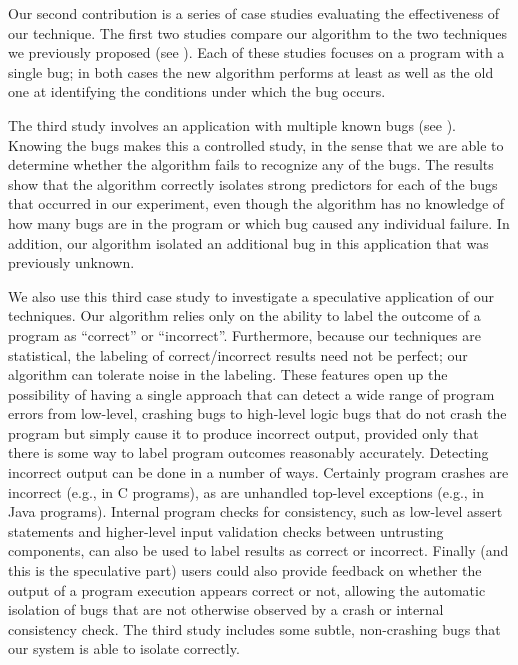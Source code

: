 \documentclass{sig-alternate}
\begin{document}
Our second contribution is a series of case studies evaluating the effectiveness of
our technique.  The first two studies compare our algorithm to the two techniques
we previously proposed (see ).  Each of these studies focuses on a
program with a single bug; in both cases the new algorithm
performs at least as well as the old one at identifying the conditions under which the bug occurs.  

The third study involves an application with multiple known bugs (see
).  Knowing the bugs makes this a controlled study, 
in the sense that we are able to determine whether the algorithm fails to recognize any of the
bugs.  The results show that the algorithm correctly
isolates strong predictors for each of the bugs that occurred in our
experiment, even though the algorithm has no knowledge of how many
bugs are in the program or which bug caused any individual failure.
In addition, our algorithm isolated an additional bug in this application that was previously unknown.

We also use this third case study to investigate a speculative
application of our techniques.  Our algorithm relies only on the
ability to label the outcome of a program as ``correct'' or
``incorrect''.  Furthermore, because our techniques are statistical,
the labeling of correct/incorrect results need not be perfect; our
algorithm can tolerate noise in the labeling.  These features open up
the possibility of having a single approach that can detect a wide
range of program errors from low-level, crashing bugs to high-level
logic bugs that do not crash the program but simply cause it to
produce incorrect output, provided only that there is some way to
label program outcomes reasonably accurately.  Detecting incorrect
output can be done in a number of ways.  Certainly program crashes are
incorrect (e.g., in C programs), as are unhandled top-level exceptions
(e.g., in Java programs).  Internal program checks for consistency,
such as low-level assert statements and higher-level input validation
checks between untrusting components, can also be used to label
results as correct or incorrect.  Finally (and this is the speculative
part) users could also provide feedback on whether the output of a
program execution appears correct or not, allowing the automatic
isolation of bugs that are not otherwise observed by a crash or
internal consistency check.  The third study includes some subtle,
non-crashing bugs that our system is able to isolate correctly.
\end{document}

